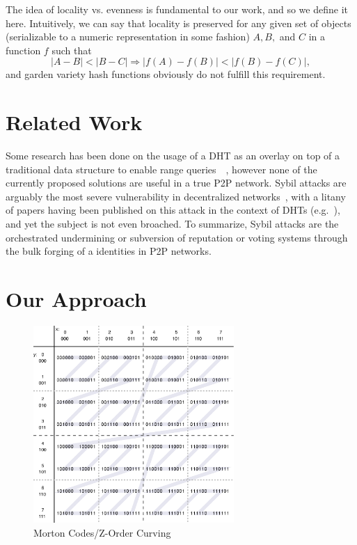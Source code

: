 \documentclass[10pt]{IEEEtran}
\begin{document}
The idea of locality vs. evenness is fundamental to our work, and so we define it here. Intuitively, we can say that locality is preserved for any given set of objects (serializable to a numeric representation in some fashion) $A,B,$ and $C$ in a function $f$ such that
\begin{equation} \label{eq:locality}
|A-B| < |B-C| \Rightarrow |f(A)-f(B)| < |f(B) - f(C)|,
\end{equation}
and garden variety hash functions obviously do not fulfill this requirement.

\section{Related Work}
\par Some research has been done on the usage of a DHT as an overlay on top of a traditional data structure to enable range queries~\cite{Ramabhadran:2004tr,Desnoyers:2008uo}~, however none of the currently proposed solutions are useful in a true P2P network. Sybil attacks are arguably the most severe vulnerability in decentralized networks~\cite{Douceur:2002jr}, with a litany of papers having been published on this attack in the context of DHTs (e.g.~\cite{LesniewskiLass:2010ue}), and yet the subject is not even broached. To summarize, Sybil attacks are the orchestrated undermining or subversion of reputation or voting systems through the bulk forging of a identities in P2P networks.



\section{Our Approach}
\begin{figure}[!t]
\centering
\includegraphics[width=3in]{ZCurve}
\caption{Morton Codes/Z-Order Curving~\cite{ZorderCurve:2015vo}}
\label{fig_MCode}
\end{figure}
\end{document}
